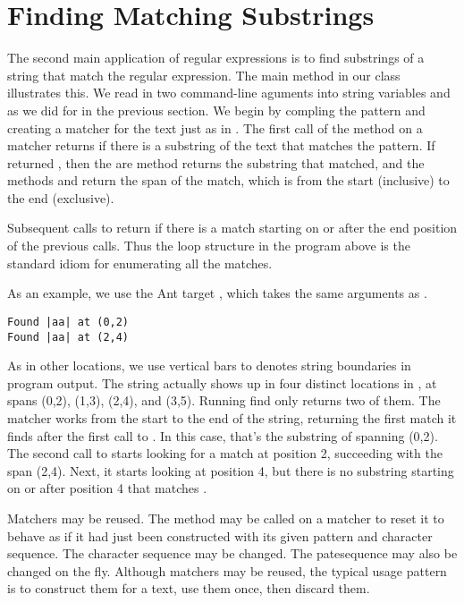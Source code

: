 \section{Finding Matching Substrings}

The second main application of regular expressions is to find
substrings of a string that match the regular expression.  The main
method in our class  illustrates this.  We read in two
command-line aguments into string variables  and 
as we did for  in the previous section.  We begin
by compling the pattern and creating a matcher for the text just
as in .
%
%
The first call of the  method on a matcher returns
 if there is a substring of the text that matches the
pattern.  If  returned , then the are method
 returns the substring that matched, and the methods
 and  return the span of the match, which is
from the start (inclusive) to the end (exclusive).

Subsequent calls to  return  if there is a
match starting on or after the end position of the previous calls.
Thus the loop structure in the program above is the standard idiom
for enumerating all the matches.  

As an example, we use the Ant target , which takes
the same arguments as .
%
\begin{verbatim}
Found |aa| at (0,2)
Found |aa| at (2,4)
\end{verbatim}
%
As in other locations, we use vertical bars to denotes string
boundaries in program output.  The string  actually
shows up in four distinct locations in , at
spans (0,2), (1,3), (2,4), and (3,5).  Running find only returns two
of them.  The matcher works from the start to the end of the string,
returning the first match it finds after the first call to
.  In this case, that's the substring of
 spanning (0,2).  The second call to
 starts looking for a match at position 2, succeeding
with the span (2,4).  Next, it starts looking at position 4, but there
is no substring starting on or after position 4 that matches
.

Matchers may be reused.  The method  may be called on a
matcher to reset it to behave as if it had just been constructed with
its given pattern and character sequence.  The character sequence may
be changed.  The patesequence may also be changed on the fly.  Although
matchers may be reused, the typical usage pattern is to construct them
for a text, use them once, then discard them.


